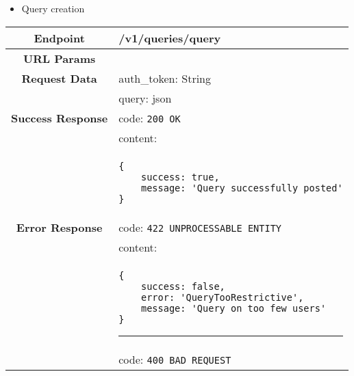    \begin{itemize}
        \item Query creation
    \end{itemize}
    \begin{adjustwidth}{1cm}{}
        \begin{longtable}{|c|l|}
            \hline
            \textbf{Endpoint} & /v1/queries/query \\
            \hline
            \textbf{URL Params} &  \\
            \hline
            \textbf{Request Data} & auth\_token: String \\
            &                 query: json \\
            \hline
            \textbf{Success Response} & code: \texttt{200 OK} \\
            &                           content: \\
            & \begin{minipage}[t]{0.5\textwidth}
                \begin{adjustwidth}{1.5cm}{}
                \begin{verbatim}
{
    success: true, 
	message: 'Query successfully posted'
}
                \end{verbatim}
                \end{adjustwidth}
              \end{minipage} \\
              \hline
            \textbf{Error Response} & code: \texttt{422 UNPROCESSABLE ENTITY} \\
            &                         content: \\
            & \begin{minipage}[t]{0.7\textwidth}
                \begin{adjustwidth}{1.5cm}{}
                \begin{verbatim}
{
    success: false, 
    error: 'QueryTooRestrictive',
    message: 'Query on too few users'
}
                \end{verbatim}
                \end{adjustwidth}
                \par\noindent\rule{\textwidth}{1pt}
                 \vspace{4pt}
              \end{minipage} \\
              &                     code: \texttt{400 BAD REQUEST} \\

\end{longtable}
\end{adjustwidth}
